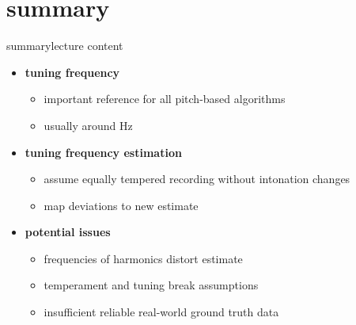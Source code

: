     \section{summary}
        \begin{frame}{summary}{lecture content}
            \begin{itemize}
                \item   \textbf{tuning frequency}
                    \begin{itemize}
                        \item   important reference for all pitch-based algorithms
                        \item   usually around \unit[440]{Hz}
                    \end{itemize}
                \bigskip
                \item  \textbf{tuning frequency estimation}
                    \begin{itemize}
                        \item   assume equally tempered recording without intonation changes
                        \item   map deviations to new estimate
                    \end{itemize}
                \bigskip
                \item  \textbf{potential issues}
                    \begin{itemize}
                        \item   frequencies of harmonics distort estimate
                        \item   temperament and tuning break assumptions
                        \item   insufficient reliable real-world ground truth data
                    \end{itemize}
            \end{itemize}
        \end{frame}

